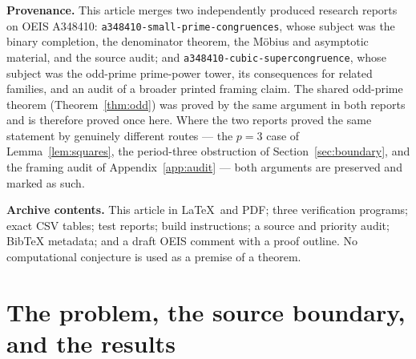 \documentclass[11pt,a4paper]{article}
\numberwithin{equation}{section}
\theoremstyle{definition}
\theoremstyle{remark}
\newcommand{\Z}{\mathbb Z}
\begin{document}
\begin{titlepage}
\begin{abstract}
Together these yield $12n^{-3}\sum_{d\mid n}\mu(d)a(n/d)\in\Z_{\ge0}$ for
every $n\ge1$, with $12$ the smallest possible common denominator, and a
primitive-necklace divisibility theorem. We isolate the exact hypothesis the
logarithmic method needs, exhibit an infinite period-three family for which
it fails modulo $5^3$, audit a printed framing statement that would have
implied the contrary, derive algebraic generating functions and two
correction terms in the asymptotic expansion, and supply exact reproducible
checks. Mathematical completeness of the written proofs and global priority
are separate matters: no claim of exhaustive novelty verification or external
peer review is made.
\end{abstract}
\vfill
\noindent\small
\textbf{Provenance.} This article merges two independently produced research
reports on OEIS A348410: \texttt{a348410-small-prime-congruences}, whose
subject was the binary completion, the denominator theorem, the M\"obius and
asymptotic material, and the source audit; and
\texttt{a348410-cubic-supercongruence}, whose subject was the odd-prime
prime-power tower, its consequences for related families, and an audit of a
broader printed framing claim. The shared odd-prime theorem
(Theorem~\ref{thm:odd}) was proved by the same argument in both reports and
is therefore proved once here. Where the two reports proved the same
statement by genuinely different routes --- the $p=3$ case of
Lemma~\ref{lem:squares}, the period-three obstruction of
Section~\ref{sec:boundary}, and the framing audit of Appendix~\ref{app:audit}
--- both arguments are preserved and marked as such.

\smallskip
\noindent\small
\textbf{Archive contents.} This article in \LaTeX\ and PDF; three verification
programs; exact CSV tables; test reports; build instructions; a source and
priority audit; BibTeX metadata; and a draft OEIS comment with a proof
outline. No computational conjecture is used as a premise of a theorem.
\end{titlepage}

\begingroup
\small
\setlength{\parskip}{0pt}
\tableofcontents
\endgroup
\clearpage

\section{The problem, the source boundary, and the results}
\label{sec:intro}
\end{document}
